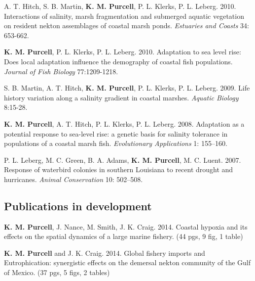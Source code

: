 \documentclass[letterpaper]{article}
\renewenvironment{itemize}{
  \begin{list}{}{
    \setlength{\leftmargin}{1em}
  }
}{
  \end{list}
}
\begin{document}
\begin{itemize}
		\item A. T. Hitch, S. B. Martin, \textbf{K. M. Purcell}, P. L. Klerks, P. L. Leberg. 2010. Interactions of salinity, marsh fragmentation and submerged aquatic vegetation on resident nekton assemblages of coastal marsh ponds. \textit{Estuaries and Coasts} 34: 653-662.
		\item \textbf{K. M. Purcell}, P. L. Klerks, P. L. Leberg. 2010. Adaptation to sea level rise: Does local adaptation influence the demography of coastal fish populations. \textit{Journal of Fish Biology} 77:1209-1218.
		\item S. B. Martin, A. T. Hitch, \textbf{K. M. Purcell}, P. L. Klerks, P. L. Leberg. 2009. Life history variation along a salinity gradient in coastal marshes. \textit{Aquatic Biology} 8:15-28.
		\item \textbf{K. M. Purcell}, A. T. Hitch, P. L. Klerks, P. L. Leberg. 2008. Adaptation as a potential response to sea-level rise: a genetic basis for salinity tolerance in populations of a coastal marsh fish. \textit{Evolutionary Applications} 1: 155–160.
		\item P. L. Leberg, M. C. Green, B. A. Adams, \textbf{K. M. Purcell}, M. C. Luent. 2007. Response of waterbird colonies in southern Louisiana to recent drought and hurricanes. \textit{Animal Conservation} 10: 502–508.
	 \end{itemize}
 
\subsection*{Publications in development}
	\begin{itemize}
		 \item \textbf{K. M. Purcell}, J. Nance, M. Smith, J. K. Craig. 2014. Coastal hypoxia and its effects on the spatial dynamics of a large marine fishery. (44 pgs, 9 fig, 1 table)
		 \item \textbf{K. M. Purcell} and J. K. Craig. 2014. Global fishery imports and Eutrophication: synergistic effects on the demersal nekton community of the Gulf of Mexico. (37 pgs, 5 figs, 2 tables)
	\end{itemize}
\end{document}
